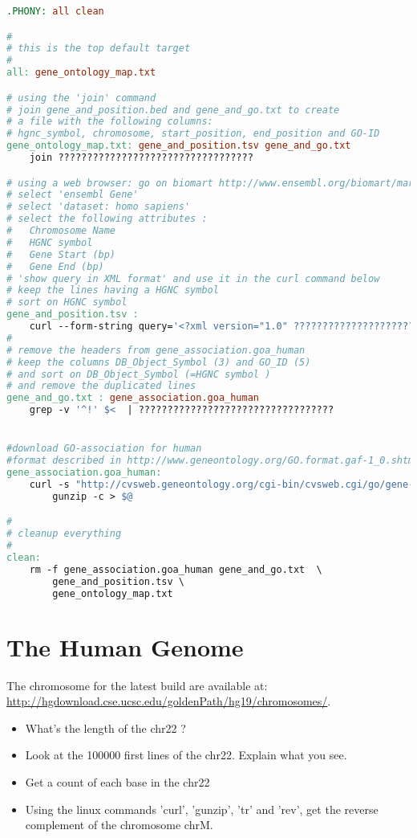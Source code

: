 \documentclass{article}
\begin{document}
\begin{lstlisting}[language=make]
.PHONY: all clean

#
# this is the top default target
#
all: gene_ontology_map.txt

# using the 'join' command
# join gene_and_position.bed and gene_and_go.txt to create 
# a file with the following columns:  
# hgnc_symbol, chromosome, start_position, end_position and GO-ID
gene_ontology_map.txt: gene_and_position.tsv gene_and_go.txt
	join ??????????????????????????????????

# using a web browser: go on biomart http://www.ensembl.org/biomart/martview/
# select 'ensembl Gene'
# select 'dataset: homo sapiens'
# select the following attributes : 
#	Chromosome Name
#	HGNC symbol 
#	Gene Start (bp)
#	Gene End (bp)
# 'show query in XML format' and use it in the curl command below
# keep the lines having a HGNC symbol
# sort on HGNC symbol 
gene_and_position.tsv : 
	curl --form-string query='<?xml version="1.0" ??????????????????????????????????
#
# remove the headers from gene_association.goa_human
# keep the columns DB_Object_Symbol (3) and GO_ID (5)
# and sort on DB_Object_Symbol (=HGNC symbol )
# and remove the duplicated lines
gene_and_go.txt : gene_association.goa_human
	grep -v '^!' $<  | ??????????????????????????????????


#download GO-association for human
#format described in http://www.geneontology.org/GO.format.gaf-1_0.shtml
gene_association.goa_human:
	curl -s "http://cvsweb.geneontology.org/cgi-bin/cvsweb.cgi/go/gene-associations/$@.gz?rev=HEAD" |\
		gunzip -c > $@

#
# cleanup everything
#
clean:
	rm -f gene_association.goa_human gene_and_go.txt  \
		gene_and_position.tsv \
		gene_ontology_map.txt
\end{lstlisting}


\section{The Human Genome}

The chromosome for the latest build are available at: \url{http://hgdownload.cse.ucsc.edu/goldenPath/hg19/chromosomes/}.
\begin{itemize}
\item What's the length of the chr22 ?
\item Look at the 100000 first lines of the chr22. Explain what you see.
\item Get a count of each base in the chr22
\item Using the linux commands 'curl', 'gunzip', 'tr' and 'rev', get the reverse complement of the chromosome chrM.
\end{itemize}
\end{document}
